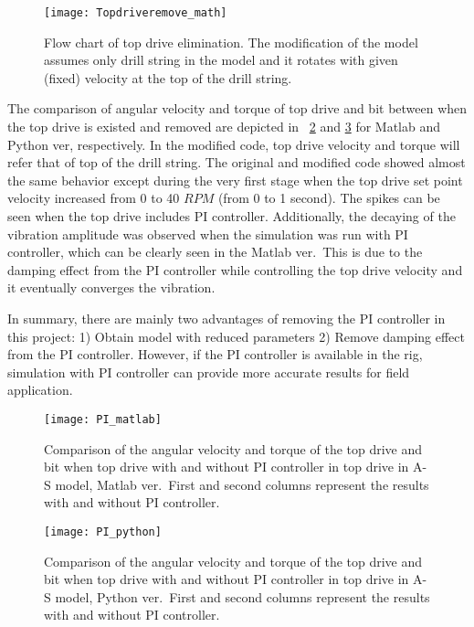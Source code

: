 \begin{figure}
  \centering
  \texttt{[image: Topdriveremove\_math]}
  \caption[Flow chart of top drive elimination]{Flow chart of top drive elimination. The modification of the model assumes only drill string in the model and it rotates with given (fixed) velocity at the top of the drill string.}\label{figure_Topdriveremove_math}
\end{figure}

The comparison of angular velocity and torque of top drive and bit between when the top drive is existed and removed are depicted in \figurename~\ref{figure_topdriveremove_Matlab} and \ref{figure_topdriveremove} for Matlab and Python ver, respectively. In the modified code, top drive velocity and torque will refer that of top of the drill string. The original and modified code showed almost the same behavior except during the very first stage when the top drive set point velocity increased from 0 to 40 $RPM$ (from 0 to 1 second). The spikes can be seen when the top drive includes PI controller. Additionally, the decaying of the vibration amplitude was observed when the simulation was run with PI controller, which can be clearly seen in the Matlab ver.\ This is due to the damping effect from the PI controller while controlling the top drive velocity and it eventually converges the vibration.

In summary, there are mainly two advantages of removing the PI controller in this project:  1) Obtain model with reduced parameters 2) Remove damping effect from the PI controller.  However, if the PI controller is available in the rig, simulation with PI controller can provide more accurate results for field application.
\begin{figure}[!hbt]
  \centering
  \texttt{[image: PI\_matlab]}
  \caption[Comparison between with and without top drive: Matlab ver]{Comparison of the angular velocity and torque of the top drive and bit when top drive with and without PI controller in top drive in A-S model, Matlab ver.\ First and second columns represent the results with and without PI controller.}\label{figure_topdriveremove_Matlab}
\end{figure}

\begin{figure}[!hbt]
  \centering
  \texttt{[image: PI\_python]}
  \caption[Comparison between with and without top drive: Python ver]{Comparison of the angular velocity and torque of the top drive and bit when top drive with and without PI controller in top drive in A-S model, Python ver.\ First and second columns represent the results with and without PI controller.}\label{figure_topdriveremove}
\end{figure}

